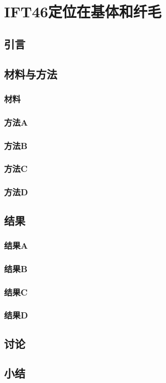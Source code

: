 \chapter{IFT46定位在基体和纤毛}
\renewcommand{\leftmark}{第三章\quad IFT46定位在基体和纤毛}

\section{引言}
\blindtext

\section{材料与方法}
\subsection{材料}
\Blindtext

\subsection{方法A}
\Blindtext

\subsection{方法B}
\Blindtext

\subsection{方法C}
\Blindtext

\subsection{方法D}
\Blindtext

\section{结果}
\subsection{结果A}
\Blindtext

\subsection{结果B}
\Blindtext

\subsection{结果C}
\Blindtext

\subsection{结果D}
\Blindtext

\section{讨论}
\Blindtext

\section{小结}
\Blindtext